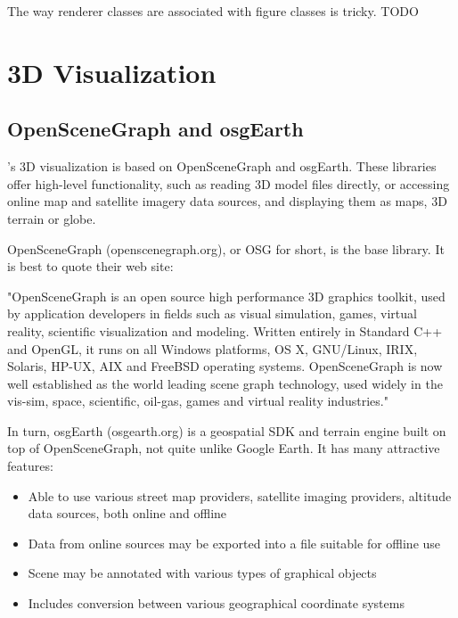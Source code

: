 The way renderer classes are associated with figure classes is tricky. TODO


\section{3D Visualization}
\label{sec:ch-graphics:osg}

\subsection{OpenSceneGraph and osgEarth}

{\opp}'s 3D visualization is based on OpenSceneGraph and osgEarth. These
libraries offer high-level functionality, such as reading 3D model files
directly, or accessing online map and satellite imagery data sources, and
displaying them as maps, 3D terrain or globe.

OpenSceneGraph (openscenegraph.org), or OSG for short, is the base library.
It is best to quote their web site:

\begin{displayquote}
"OpenSceneGraph is an open source high performance 3D graphics toolkit,
used by application developers in fields such as visual simulation, games,
virtual reality, scientific visualization and modeling. Written entirely in
Standard C++ and OpenGL, it runs on all Windows platforms, OS X, GNU/Linux,
IRIX, Solaris, HP-UX, AIX and FreeBSD operating systems. OpenSceneGraph is
now well established as the world leading scene graph technology, used
widely in the vis-sim, space, scientific, oil-gas, games and virtual
reality industries."
\end{displayquote}

In turn, osgEarth (osgearth.org) is a geospatial SDK and terrain engine built on top
of OpenSceneGraph, not quite unlike Google Earth. It has many attractive features:

\begin{itemize}
\item Able to use various street map providers, satellite imaging providers, altitude data sources, both online and offline
\item Data from online sources may be exported into a file suitable for offline use
\item Scene may be annotated with various types of graphical objects
\item Includes conversion between various geographical coordinate systems
\end{itemize}

